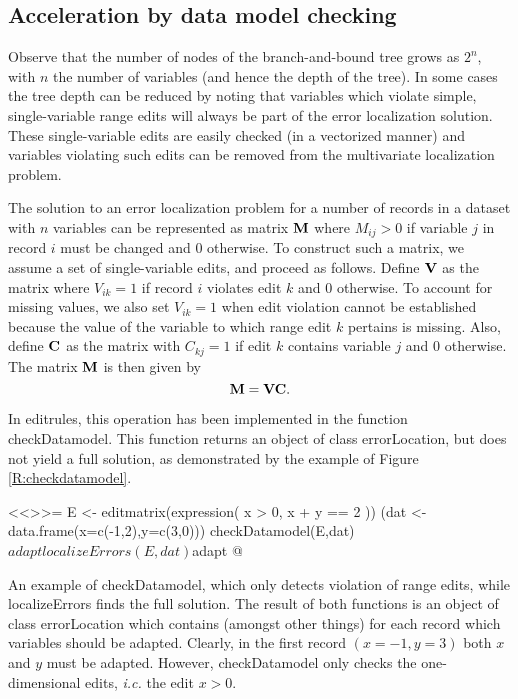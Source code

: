 \documentclass[11pt,fleqn,a4paper]{article}
\begin{document}
\subsection{Acceleration by data model checking}
Observe that the number of nodes of the branch-and-bound tree grows as $2^n$,
with $n$ the number of variables (and hence the depth of the tree).  In some
cases the tree depth can be reduced by noting that variables which violate
simple, single-variable range edits will always be part of the error
localization solution. These single-variable edits are easily checked (in a
vectorized manner) and variables violating such edits can be removed from the
multivariate localization problem. 

The solution to an error localization problem for a number of records in a
dataset with $n$ variables can be represented as matrix ${\bf M}$ where
$M_{ij}>0$ if variable $j$ in record $i$ must be changed and $0$ otherwise.  To
construct such a matrix, we assume a set of single-variable edits, and
proceed as follows.  Define ${\bf V}$ as the matrix where $V_{ik}=1$ if
record $i$ violates edit $k$ and $0$ otherwise.  To account for missing values,
we also set $V_{ik}=1$ when edit violation cannot be established because the
value of the variable to which range edit $k$ pertains is missing.  Also,
define ${\bf C}$ as the matrix with $C_{kj}=1$ if edit $k$ contains
variable $j$ and $0$ otherwise. The matrix ${\bf M}$ is then given by
\begin{equation}
{\bf M} = {\bf V}{\bf C}.
\end{equation} 

In {\sf editrules}, this operation has been implemented in the function {\sf checkDatamodel}.
This function returns an object of class {\sf errorLocation}, but does not yield a full solution,
as demonstrated by the example of Figure \ref{R:checkdatamodel}.

\addtocounter{figure}{1}
\begin{Rcode}
<<>>=
E <- editmatrix(expression(
    x > 0,
    x + y == 2
))
(dat <- data.frame(x=c(-1,2),y=c(3,0)))
checkDatamodel(E,dat)$adapt
localizeErrors(E,dat)$adapt
@
\caption{An example of {\sf checkDatamodel}, which only detects violation of range edits,
while {\sf localizeErrors} finds the full solution. The result of both functions is an
object of class {\sf errorLocation} which contains (amongst other things) for each record
which variables should be adapted. Clearly, in the first record $(x=-1,y=3)$ both $x$ and $y$
must be adapted. However, {\sf checkDatamodel} only checks the one-dimensional edits, {\em i.c.}
the edit $x>0$.
}
\label{R:checkdatamodel}
\end{Rcode}
\end{document}
